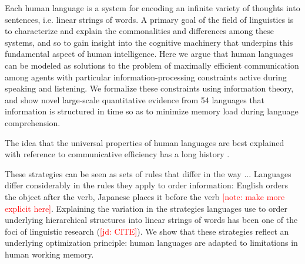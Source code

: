 \documentclass[12pt]{article}
\newcommand{\jd}[1]{\textcolor{Red}{[jd: #1]}}
\newcommand{\note}[1]{\textcolor{Red}{[note: #1]}}
\begin{document}




Each human language is a system for encoding an infinite variety of thoughts into sentences, i.e. linear strings of words.
A primary goal of the field of linguistics is to characterize and explain the commonalities and differences among these systems, and so to gain insight into the cognitive machinery that underpins this fundamental aspect of human intelligence.
Here we argue that human languages can be modeled as solutions to the problem of maximally efficient communication among agents with particular information-processing constraints active during speaking and listening.
We formalize these constraints using information theory, and show novel large-scale quantitative evidence from 54 languages that information is structured in time so as to minimize memory load during language comprehension.

The idea that the universal properties of human languages are best explained with reference to communicative efficiency has a long history \cite{gabelentz1901sprachwissenschaft,zipf1949human,hockett1960origin,givon1991markedness,hawkins1994performance,hawkins2004efficiency,hawkins2014crosslinguistic,croft2001functional,haspelmath2008parametric,jaeger2011language,gibson2019efficiency}.



These strategies can be seen as sets of rules that differ in the way ...
Languages differ considerably in the rules they apply to order information: English orders the object after the verb, Japanese places it before the verb \note{make more explicit here}.
Explaining the variation in the strategies languages use to  order underlying hierarchical structures into linear strings of words has been one of the foci of linguistic research (\jd{CITE}).
We show that these strategies reflect an underlying optimization principle: human languages are adapted to limitations in human working memory.
\end{document}
